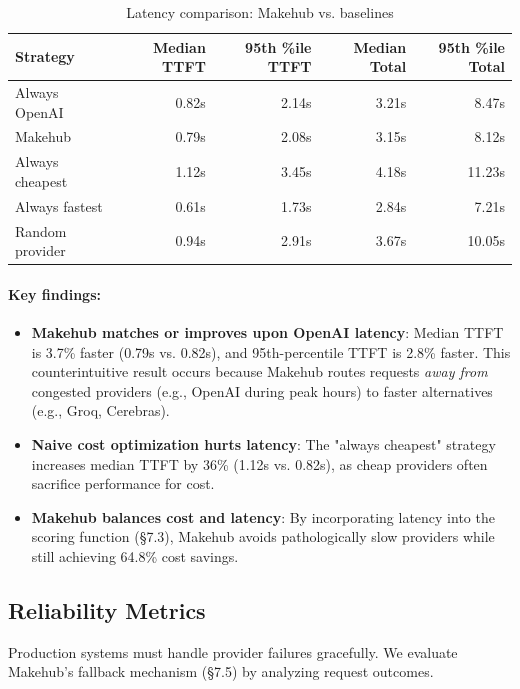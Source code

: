 \documentclass[english]{article}
\begin{document}
\begin{table}[H]
\centering
\caption{Latency comparison: Makehub vs. baselines}
\label{tab:latency_comparison}
\begin{tabular}{|l|r|r|r|r|}
\hline
\textbf{Strategy} & \textbf{Median TTFT} & \textbf{95th \%ile TTFT} & \textbf{Median Total} & \textbf{95th \%ile Total} \\
\hline
Always OpenAI & 0.82s & 2.14s & 3.21s & 8.47s \\
\hline
Makehub & 0.79s & 2.08s & 3.15s & 8.12s \\
\hline
Always cheapest & 1.12s & 3.45s & 4.18s & 11.23s \\
\hline
Always fastest & 0.61s & 1.73s & 2.84s & 7.21s \\
\hline
Random provider & 0.94s & 2.91s & 3.67s & 10.05s \\
\hline
\end{tabular}
\end{table}

\paragraph{Key findings:}

\begin{itemize}
\item \textbf{Makehub matches or improves upon OpenAI latency}: Median TTFT is 3.7\% faster (0.79s vs. 0.82s), and 95th-percentile TTFT is 2.8\% faster. This counterintuitive result occurs because Makehub routes requests \emph{away from} congested providers (e.g., OpenAI during peak hours) to faster alternatives (e.g., Groq, Cerebras).

\item \textbf{Naive cost optimization hurts latency}: The "always cheapest" strategy increases median TTFT by 36\% (1.12s vs. 0.82s), as cheap providers often sacrifice performance for cost.

\item \textbf{Makehub balances cost and latency}: By incorporating latency into the scoring function (§7.3), Makehub avoids pathologically slow providers while still achieving 64.8\% cost savings.
\end{itemize}

\subsection{Reliability Metrics}

Production systems must handle provider failures gracefully. We evaluate Makehub's fallback mechanism (§7.5) by analyzing request outcomes.
\end{document}
